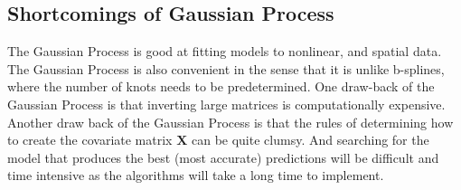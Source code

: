 \documentclass{article}                                                   %
\begin{document}
  \subsection{Shortcomings of Gaussian Process}
    The Gaussian Process is good at fitting models to nonlinear, and spatial
    data.  The Gaussian Process is also convenient in the sense that it is
    unlike b-splines, where the number of knots needs to be predetermined.  One
    draw-back of the Gaussian Process is that inverting large matrices is
    computationally expensive. Another draw back of the Gaussian Process is
    that the rules of determining how to create the covariate matrix $\bm X$
    can be quite clumsy. And searching for the model that produces the best
    (most accurate) predictions will be difficult and time intensive as the
    algorithms will take a long time to implement.
\end{document}
